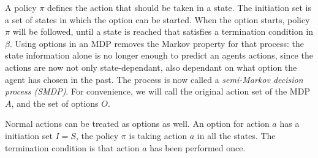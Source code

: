 A policy $\pi$ defines the action that should be taken in a state. The
initiation set is a set of states in which the option can be started. When the
option starts, policy $\pi$ will be followed, until a state is reached that
satisfies a termination condition in $\beta$. Using options in an MDP removes
the Markov property for that process: the state information alone is no longer
enough to predict an agents actions, since the actions are now not only
state-dependant, also dependant on what option the agent has chosen in the past.
The process is now called a \emph{semi-Markov decision process (SMDP)}. For
convenience, we will call the original action set of the MDP $A$, and the set of
options $O$.

Normal actions can be treated as options as well. An option for action $a$ has a
initiation set $I = S$, the policy $\pi$ is taking action $a$ in all the states.
The termination condition is that action $a$ has been performed once.


